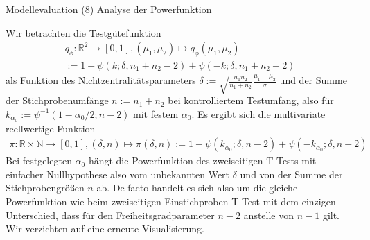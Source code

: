 \documentclass[
  8pt,
  ignorenonframetext,
]{beamer}
\begin{document}
\begin{frame}{Modellevaluation}
\protect\hypertarget{modellevaluation-36}{}
\noindent (8) Analyse der Powerfunktion

\small

Wir betrachten die Testgütefunktion \begin{multline}
q_{\phi} : \mathbb{R}^2 \to [0,1],
(\mu_1, \mu_2) \mapsto q_{\phi}(\mu_1, \mu_2)
\\ := 1 - \psi(k;\delta,n_1+n_2-2) + \psi(-k;\delta,n_1+n_2-2)
\end{multline} als Funktion des Nichtzentralitätsparameters
\(\delta := \sqrt{\frac{n_1n_2}{n_1+n_2}}\frac{\mu_1-\mu_2}{\sigma}\)
und der Summe der Stichprobenumfänge \(n := n_1 + n_2\) bei
kontrolliertem Testumfang, also für
\(k_{\alpha_0} := \psi^{-1}(1-\alpha_0/2;n-2)\) mit festem \(\alpha_0\).
Es ergibt sich die multivariate reellwertige Funktion \begin{multline}
\pi : \mathbb{R} \times \mathbb{N} \to [0,1],
(\delta,n) \mapsto
\pi(\delta,n) := 1-\psi(k_{\alpha_0};\delta,n-2)+\psi(-k_{\alpha_0}; \delta,n-2)
\end{multline} Bei festgelegten \(\alpha_0\) hängt die Powerfunktion des
zweiseitigen T-Tests mit einfacher Nullhypothese also vom unbekannten
Wert \(\delta\) und von der Summe der Stichprobengrößen \(n\) ab.
De-facto handelt es sich also um die gleiche Powerfunktion wie beim
zweiseitigen Einstichproben-T-Test mit dem einzigen Unterschied, dass
für den Freiheitsgradparameter \(n-2\) anstelle von \(n-1\) gilt. Wir
verzichten auf eine erneute Visualisierung. \vfill
\end{frame}
\end{document}
